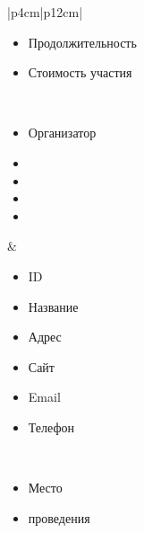 \begin{table}[h!]
\begin{center}
\begin{threeparttable}
\begin{tabular}{|p{4cm}|p{12cm}|}
\begin{minipage}[t]{\linewidth}
\begin{multicols}{2}
\begin{itemize}[labelsep=0mm,nosep,after=\strut]
                  \item[] Продолжительность
                  \item[] Стоимость участия
                \end{itemize}
              \end{multicols}
            \end{minipage}\\
            \hline
            \begin{minipage}[t]{\linewidth}
              \begin{multicols}{1}
                \begin{itemize}[labelsep=0mm,nosep,after=\strut]
                  \item[] Организатор
                  \item[]
                  \item[]
                  \item[]
                  \item[]
                \end{itemize}
              \end{multicols}
            \end{minipage}
          & \begin{minipage}[t]{\linewidth}
              \begin{multicols}{2}
                \begin{itemize}[labelsep=0mm,nosep,after=\strut]
                  \item[] ID
                  \item[] Название
                  \item[] Адрес
                  \item[] Сайт
                  \item[] Email
                  \item[] Телефон
                \end{itemize}
              \end{multicols}
            \end{minipage}\\
            \hline
            \begin{minipage}[t]{\linewidth}
              \begin{multicols}{1}
                \begin{itemize}[labelsep=0mm,nosep,after=\strut]
                  \item[] Место 
                  \item[] проведения

\end{itemize}
\end{multicols}
\end{minipage}
\end{tabular}
\end{threeparttable}
\end{center}
\end{table}
